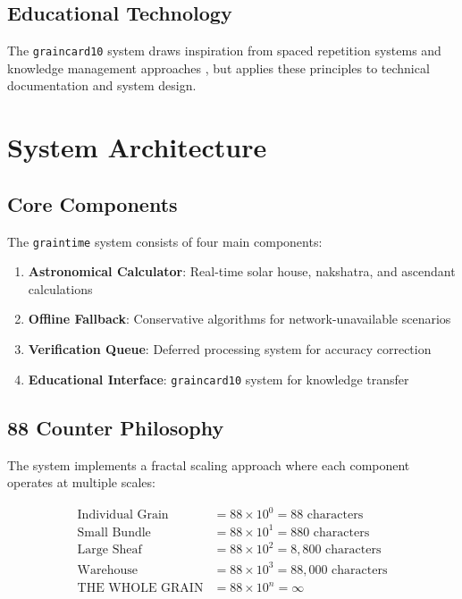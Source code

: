 \documentclass[11pt]{article}
\newcommand{\graintime}{\texttt{graintime}}
\newcommand{\graincard}{\texttt{graincard10}}
\begin{document}
\subsection{Educational Technology}

The \graincard{} system draws inspiration from spaced repetition systems \cite{ebbinghaus1885memory} and knowledge management approaches \cite{novak2010learning}, but applies these principles to technical documentation and system design.

\section{System Architecture}

\subsection{Core Components}

The \graintime{} system consists of four main components:

\begin{enumerate}
    \item \textbf{Astronomical Calculator}: Real-time solar house, nakshatra, and ascendant calculations
    \item \textbf{Offline Fallback}: Conservative algorithms for network-unavailable scenarios
    \item \textbf{Verification Queue}: Deferred processing system for accuracy correction
    \item \textbf{Educational Interface}: \graincard{} system for knowledge transfer
\end{enumerate}

\subsection{88 Counter Philosophy}

The system implements a fractal scaling approach where each component operates at multiple scales:

\begin{align}
\text{Individual Grain} &= 88 \times 10^0 = 88 \text{ characters} \\
\text{Small Bundle} &= 88 \times 10^1 = 880 \text{ characters} \\
\text{Large Sheaf} &= 88 \times 10^2 = 8,800 \text{ characters} \\
\text{Warehouse} &= 88 \times 10^3 = 88,000 \text{ characters} \\
\text{THE WHOLE GRAIN} &= 88 \times 10^n = \infty
\end{align}
\end{document}
